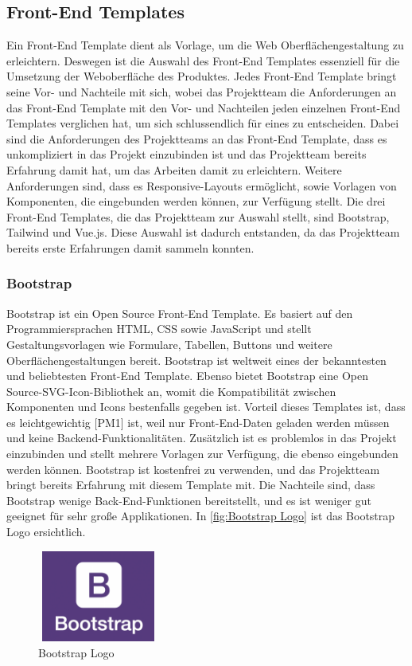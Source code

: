 \subsection{Front-End Templates}
Ein Front-End Template dient als Vorlage, um die Web Oberflächengestaltung zu erleichtern.
Deswegen ist die Auswahl des Front-End Templates essenziell für die Umsetzung der Weboberfläche des Produktes. Jedes Front-End Template bringt seine Vor- und Nachteile mit sich, wobei das Projektteam die Anforderungen an das Front-End Template mit den Vor- und Nachteilen jeden einzelnen Front-End Templates verglichen hat, um sich schlussendlich für eines zu entscheiden. Dabei sind die Anforderungen des Projektteams an das Front-End Template, dass es unkompliziert in das Projekt einzubinden ist und das Projektteam bereits Erfahrung damit hat, um das Arbeiten damit zu erleichtern. Weitere Anforderungen sind, dass es Responsive-Layouts ermöglicht, sowie Vorlagen von Komponenten, die eingebunden werden können, zur Verfügung stellt. Die drei Front-End Templates, die das Projektteam zur Auswahl stellt, sind Bootstrap, Tailwind und Vue.js. Diese Auswahl ist dadurch entstanden, da das Projektteam bereits erste Erfahrungen damit sammeln konnten.


\subsubsection{Bootstrap}
Bootstrap ist ein Open Source Front-End Template. Es basiert auf den Programmiersprachen HTML, CSS sowie JavaScript und stellt Gestaltungsvorlagen wie Formulare, Tabellen, Buttons und weitere Oberflächengestaltungen bereit. Bootstrap ist weltweit eines der bekanntesten und beliebtesten Front-End Template. Ebenso bietet Bootstrap eine Open Source-SVG-Icon-Bibliothek an, womit die Kompatibilität zwischen Komponenten und Icons bestenfalls gegeben ist. Vorteil dieses Templates ist, dass es leichtgewichtig [PM1] ist, weil nur Front-End-Daten geladen werden müssen und keine Backend-Funktionalitäten. Zusätzlich ist es problemlos in das Projekt einzubinden und stellt mehrere Vorlagen zur Verfügung, die ebenso eingebunden werden können. Bootstrap ist kostenfrei zu verwenden, und das Projektteam bringt bereits Erfahrung mit diesem Template mit. Die Nachteile sind, dass Bootstrap wenige Back-End-Funktionen bereitstellt, und es ist weniger gut geeignet für sehr große Applikationen.
 In \autoref{fig:Bootstrap Logo}
 ist das Bootstrap Logo ersichtlich.
\newline
\begin{figure}[h]
	\centering
	\includegraphics[height=3cm,width=4cm]{images/Bootstrap}
	\caption{Bootstrap Logo}
	\label{fig:Bootstrap Logo}
\end{figure}

